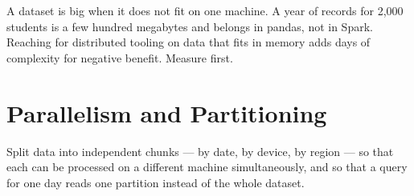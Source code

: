 \begin{alertbox}
A dataset is big when it does not fit on one machine. A year of records for
2{,}000 students is a few hundred megabytes and belongs in pandas, not in Spark.
Reaching for distributed tooling on data that fits in memory adds days of
complexity for negative benefit. Measure first.
\end{alertbox}

\section{Parallelism and Partitioning}

\begin{definitionbox}[Partitioning]
Split data into independent chunks --- by date, by device, by region --- so that
each can be processed on a different machine simultaneously, and so that a query
for one day reads one partition instead of the whole dataset.
\end{definitionbox}

